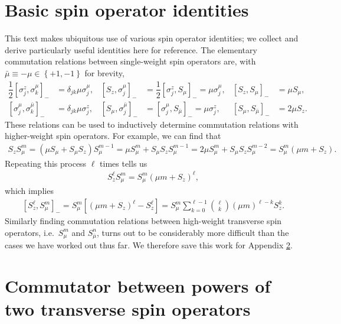 \documentclass[aps,notitlepage,nofootinbib,11pt]{revtex4-1}
\newcommand{\f}[2]{\dfrac{#1}{#2}} %
\newcommand{\p}[1]{\left(#1\right)} %
\renewcommand{\sp}[1]{\left[#1\right]} %
\renewcommand{\set}[1]{\left\{#1\right\}} %
\newcommand{\bmu}{{\bar\mu}}
\newcommand{\1}{\mathds{1}}
\begin{document}


\newpage
\appendix

\section{Basic spin operator identities}
\label{sec:identities}

This text makes ubiquitous use of various spin operator identities; we
collect and derive particularly useful identities here for reference.
The elementary commutation relations between single-weight spin
operators are, with $\bmu\equiv-\mu\in\set{+1,-1}$ for brevity,
\begin{align}
  \f12 \sp{\sigma_j^z,\sigma_k^\mu}_-
  &= \delta_{jk} \mu \sigma_j^\mu,
  &
  \sp{S_z,\sigma_j^\mu}_-
  &= \f12 \sp{\sigma_j^z,S_\mu}_- = \mu \sigma_j^\mu,
  &
  \sp{S_z,S_\mu}_-
  &= \mu S_\mu,
  \label{eq:comm_z_mu_base} \\
  \sp{\sigma_j^\mu,\sigma_k^\bmu}_-
  &= \delta_{jk} \mu \sigma_j^z,
  &
  \sp{S_\mu,\sigma_j^\bmu}_-
  &= \sp{\sigma_j^\mu,S_\bmu}_- = \mu \sigma_j^z,
  &
  \sp{S_\mu,S_\bmu}_-
  &= 2 \mu S_z.
  \label{eq:comm_mu_base}
\end{align}
These relations can be used to inductively determine commutation
relations with higher-weight spin operators.  For example, we can find
that
\begin{align}
  S_z S_\mu^m
  = \p{\mu S_\mu + S_\mu S_z} S_\mu^{m-1}
  = \mu S_\mu^m + S_\mu S_z S_\mu^{m-1}
  = 2 \mu S_\mu^m + S_\mu S_z S_\mu^{m-2}
  = S_\mu^m \p{\mu m + S_z}.
  \label{eq:push_z_mu_single}
\end{align}
Repeating this process $\ell$ times tells us
\begin{align}
  S_z^\ell S_\mu^m = S_\mu^m \p{\mu m + S_z}^\ell,
  \label{eq:push_z_mu}
\end{align}
which implies
\begin{align}
  \sp{S_z^\ell, S_\mu^m}_-
  = S_\mu^m \sp{\p{\mu m + S_z}^\ell - S_z^\ell}
  = S_\mu^m \sum_{k=0}^{\ell-1} {\ell \choose k} \p{\mu m}^{\ell-k} S_z^k.
  \label{eq:comm_z_mu}
\end{align}
Similarly finding commutation relations between high-weight transverse
spin operators, i.e.~$S_\mu^m$ and $S_\bmu^n$, turns out to be
considerably more difficult than the cases we have worked out thus
far.  We therefore save this work for Appendix
\ref{sec:comm_transverse}.


\section{Commutator between powers of two transverse spin operators}
\label{sec:comm_transverse}
\end{document}
